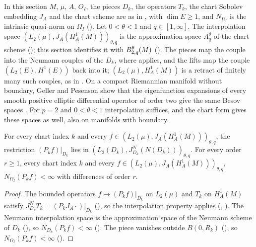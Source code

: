 In this section $M$, $\mu$, $A$, $O_I$, the pieces $D_k$, the operators $T_k$, the chart Sobolev
embedding $J_A$ and the chart scheme are as in , with
$\dim E \geq 1$, and $N_{\Omega_I}$ is the intrinsic quasi-norm on $\Omega_I$
(). Let $0 < \theta < 1$ and $q \in [1, \infty]$. The interpolation space
$(L_2(\mu), J_A(H^1_A(M)))_{\theta, q}$ is the approximation space $A^\theta_q$ of the chart scheme
(); this section identifies it with
$B^{\theta}_{2,q}(M)$ (). The pieces map the couple into the Neumann
couples of the $D_k$, where  applies, and the lifts map the couple
$(L_2(E), H^1(E))$ back into it; $(L_2(\mu), H^1_A(M))$ is a retract of finitely many such
couples, as in \cite[Theorem~6.4.2]{BerghLofstrom}. On a compact Riemannian manifold without
boundary, Geller and Pesenson show that the eigenfunction expansions of every smooth positive
elliptic differential operator of order two give the same Besov spaces
\cite[Theorem~7.5]{GellerPesenson2011}. For $p = 2$ and $0 < \theta < 1$ interpolation suffices,
and the chart form gives these spaces as well, also on manifolds with boundary.

\begin{lemma}
\label{lem:chart-couple-forward}
\leanok
{}
For every chart index $k$ and every $f \in (L_2(\mu), J_A(H^1_A(M)))_{\theta, q}$, the
restriction $(P_k f)|_{D_k}$ lies in $(L_2(D_k), J^N_{D_k}(N(D_k)))_{\theta, q}$. For every order
$r \geq 1$, every chart index $k$ and every $f \in (L_2(\mu), J_A(H^1_A(M)))_{\theta, q}$,
$N_{\Omega_I}(P_k f) < \infty$ with differences of order $r$.
\end{lemma}

\begin{proof}
\leanok
The bounded operators $f \mapsto (P_k f)|_{D_k}$ on $L_2(\mu)$ and $T_k$ on $H^1_A(M)$ satisfy
$J^N_{D_k} T_k = (P_k J_A \cdot)|_{D_k}$ (), so the interpolation
property applies (,
). The Neumann interpolation space is the approximation space of
the Neumann scheme of $D_k$ (), so $N_{D_k}(P_k f) < \infty$
(). The piece vanishes outside $B(0, R_k)$
(), so $N_{\Omega_I}(P_k f) < \infty$
().
\end{proof}

